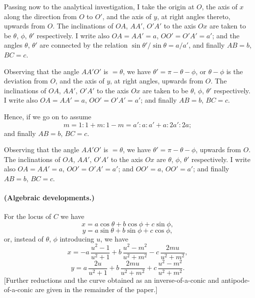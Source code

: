 \documentclass[11pt,a4paper]{article}
\begin{document}
\medskip

Passing now to the analytical investigation, I take the origin at $O$, the axis of
$x$ along the direction from $O$ to $O'$, and the axis of $y$, at right angles
thereto, upwards from $O$. The inclinations of $OA$, $AA'$, $O'A'$ to the axis $Ox$
are taken to be $\theta$, $\phi$, $\theta'$ respectively. I write also $OA = AA' = a$,
$OO' = O'A' = a'$; and the angles $\theta$, $\theta'$ are connected by the relation
$\sin\theta'/\sin\theta = a/a'$, and finally $AB = b$, $BC = c$.

\medskip

Observing that the angle $AA'O'$ is $= \theta$, we have $\theta' = \pi - \theta - \phi$,
or $\theta - \phi$ is the deviation from $O$, and the axis of $y$, at right angles,
upwards from $O$. The inclinations of $OA$, $AA'$, $O'A'$ to the axis $Ox$ are
taken to be $\theta$, $\phi$, $\theta'$ respectively. I write also $OA = AA' = a$,
$OO' = O'A' = a'$; and finally $AB = b$, $BC = c$.

\medskip

Hence, if we go on to assume
\[
m = 1 : 1 + m : 1 - m = a' : a : a' + a : 2a' : 2a;
\]
and finally $AB = b$, $BC = c$.

\medskip

Observing that the angle $AA'O'$ is $= \theta$, we have $\theta' = \pi - \theta - \phi$,
upwards from $O$. The inclinations of $OA$, $AA'$, $O'A'$ to the axis $Ox$ are
$\theta$, $\phi$, $\theta'$ respectively. I write also $OA = AA' = a$,
$OO' = O'A' = a'$; and $OO' = a$, $OO' = a'$; and finally $AB = b$, $BC = c$.

\medskip

\paragraph{(Algebraic developments.)} For the locus of $C$ we have
\[
x = a\cos\theta + b\cos\phi + c\sin\phi,
\]
\[
y = a\sin\theta + b\sin\phi + c\cos\phi,
\]
or, instead of $\theta$, $\phi$ introducing $u$, we have
\[
x = -a\,\frac{u^2 - 1}{u^2 + 1} + b\,\frac{u^2 - m^2}{u^2 + m^2} - c\,\frac{2 m u}{u^2 + m^2},
\]
\[
y = a\,\frac{2 u}{u^2 + 1} + b\,\frac{2 m u}{u^2 + m^2} + c\,\frac{u^2 - m^2}{u^2 + m^2}.
\]
[Further reductions and the curve obtained as an inverse-of-a-conic and antipode-of-a-conic
are given in the remainder of the paper.]

\medskip
\end{document}
